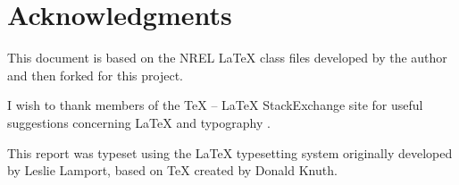 \section*{Acknowledgments}
This document is based on the NREL LaTeX class files developed by the author and then forked for this project.

I wish to thank members of the TeX -- LaTeX StackExchange site for useful suggestions concerning LaTeX and typography \citep{texstackexchange}.

This report was typeset using the LaTeX typesetting system originally developed by Leslie Lamport, based on TeX created by Donald Knuth.